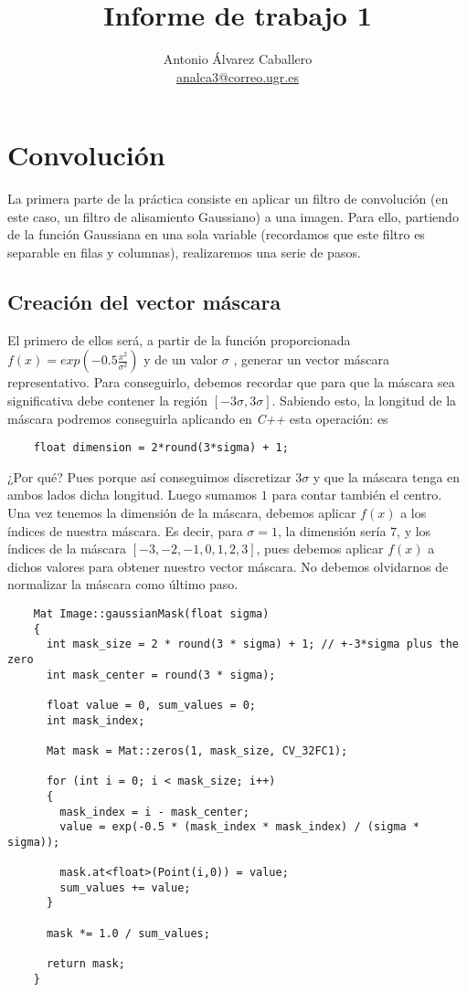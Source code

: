 \documentclass[a4paper, 11pt]{article}
\title{Informe de trabajo 1}
\author{Antonio Álvarez Caballero\\
    \href{mailto:analca3@correo.ugr.es}{analca3@correo.ugr.es}}
\date{}
\theoremstyle{definition}
\begin{document}
  \maketitle

  \section{Convolución}

  La primera parte de la práctica consiste en aplicar un filtro de convolución
  (en este caso, un filtro de alisamiento Gaussiano) a una imagen. Para ello,
  partiendo de la función Gaussiana en una sola variable (recordamos que este filtro
  es separable en filas y columnas), realizaremos una serie de pasos.

  \subsection{Creación del vector máscara}

  El primero de ellos será, a partir de la función proporcionada $f(x)=exp(-0.5\frac{x^2}{\sigma^2})$
  y de un valor $\sigma$ , generar un vector máscara representativo. Para conseguirlo,
  debemos recordar que para que la máscara sea significativa debe contener la región
  $[-3\sigma,3\sigma]$. Sabiendo esto, la longitud de la máscara podremos conseguirla
  aplicando en \textit{C++} esta operación:
  es

  \begin{lstlisting}
    float dimension = 2*round(3*sigma) + 1;
  \end{lstlisting}

  ¿Por qué? Pues porque así conseguimos discretizar $3\sigma$ y que la máscara
  tenga en ambos lados dicha longitud. Luego sumamos $1$ para contar también el centro.\\

  Una vez tenemos la dimensión de la máscara, debemos aplicar $f(x)$ a los índices
  de nuestra máscara. Es decir, para $\sigma = 1$, la dimensión sería $7$, y los
  índices de la máscara $[-3,-2,-1,0,1,2,3]$, pues debemos aplicar $f(x)$ a dichos
  valores para obtener nuestro vector máscara. No debemos olvidarnos de normalizar
  la máscara como último paso.

  \begin{lstlisting}
    Mat Image::gaussianMask(float sigma)
    {
      int mask_size = 2 * round(3 * sigma) + 1; // +-3*sigma plus the zero
      int mask_center = round(3 * sigma);

      float value = 0, sum_values = 0;
      int mask_index;

      Mat mask = Mat::zeros(1, mask_size, CV_32FC1);

      for (int i = 0; i < mask_size; i++)
      {
        mask_index = i - mask_center;
        value = exp(-0.5 * (mask_index * mask_index) / (sigma * sigma));

        mask.at<float>(Point(i,0)) = value;
        sum_values += value;
      }

      mask *= 1.0 / sum_values;

      return mask;
    }
  \end{lstlisting}
\end{document}
